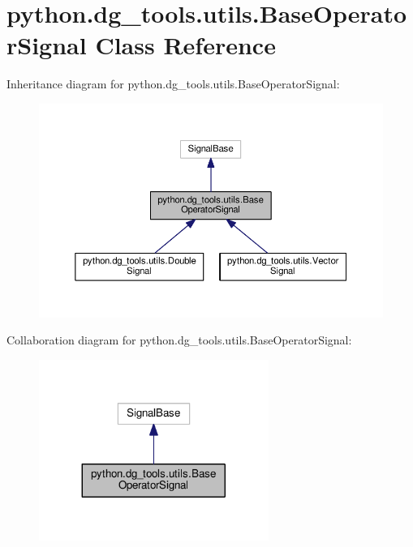 \hypertarget{classpython_1_1dg__tools_1_1utils_1_1BaseOperatorSignal}{}\section{python.\+dg\+\_\+tools.\+utils.\+Base\+Operator\+Signal Class Reference}
\label{classpython_1_1dg__tools_1_1utils_1_1BaseOperatorSignal}


Inheritance diagram for python.\+dg\+\_\+tools.\+utils.\+Base\+Operator\+Signal\+:
\nopagebreak
\begin{figure}[H]
\begin{center}
\leavevmode
\includegraphics[width=350pt]{classpython_1_1dg__tools_1_1utils_1_1BaseOperatorSignal__inherit__graph}
\end{center}
\end{figure}


Collaboration diagram for python.\+dg\+\_\+tools.\+utils.\+Base\+Operator\+Signal\+:
\nopagebreak
\begin{figure}[H]
\begin{center}
\leavevmode
\includegraphics[width=212pt]{classpython_1_1dg__tools_1_1utils_1_1BaseOperatorSignal__coll__graph}
\end{center}
\end{figure}

